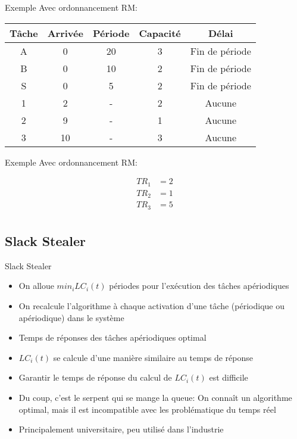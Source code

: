 \begin{frame}{Exemple}
  Avec ordonnancement RM:
  \begin{center}
    \begin{tabular}{ccccc}
      \hline
      Tâche & Arrivée & Période & Capacité & Délai \\
      \hline
      A &  0 & 20 & 3 & Fin de période\\
      B &  0 & 10 & 2 & Fin de période\\
      S &  0 &  5 & 2 & Fin de période\\
      1 &  2 &  - & 2 & Aucune\\
      2 &  9 &  - & 1 & Aucune\\
      3 & 10 &  - & 3 & Aucune\\
      \hline
    \end{tabular}
    \pause
  
  \end{center}
\end{frame}

\begin{frame}{Exemple}
  Avec ordonnancement RM:
  \begin{center}
    
    \begin{align*}
      TR_1 &= 2\\
      TR_2 &= 1\\
      TR_3 &= 5\\
    \end{align*}
  \end{center}
\end{frame}

\subsection{Slack Stealer}

\begin{frame}{Slack Stealer}
  \begin{itemize}
  \item On alloue $min_i LC_i(t)$ périodes pour l'exécution des tâches
    apériodiques
  \item  On recalcule  l'algorithme  à chaque  activation d'une  tâche
    (périodique ou apériodique) dans le système
  \item Temps de réponses des tâches apériodiques optimal
  \item  $LC_i(t)$ se  calcule  d'une manière  similaire  au temps  de
    réponse
  \item  Garantir le  temps  de  réponse du  calcul  de $LC_i(t)$  est
    difficile
  \item Du coup, c'est le serpent qui se mange la queue: On connaît un
    algorithme   optimal,   mais   il   est  incompatible   avec   les
    problématique du temps réel
  \item Principalement universitaire, peu utilisé dans l'industrie
  \end{itemize}
\end{frame}

